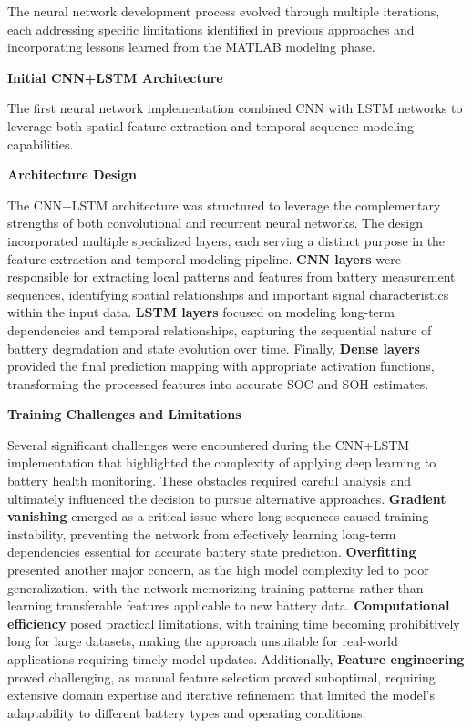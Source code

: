 The neural network development process evolved through multiple iterations, each addressing specific limitations identified in previous approaches and incorporating lessons learned from the MATLAB modeling phase.

\textbf{Initial CNN+LSTM Architecture}

The first neural network implementation combined CNN with LSTM networks to leverage both spatial feature extraction and temporal sequence modeling capabilities.

\textbf{Architecture Design}

The CNN+LSTM architecture was structured to leverage the complementary strengths of both convolutional and recurrent neural networks. The design incorporated multiple specialized layers, each serving a distinct purpose in the feature extraction and temporal modeling pipeline. \textbf{CNN layers} were responsible for extracting local patterns and features from battery measurement sequences, identifying spatial relationships and important signal characteristics within the input data. \textbf{LSTM layers} focused on modeling long-term dependencies and temporal relationships, capturing the sequential nature of battery degradation and state evolution over time. Finally, \textbf{Dense layers} provided the final prediction mapping with appropriate activation functions, transforming the processed features into accurate SOC and SOH estimates.

\textbf{Training Challenges and Limitations}

Several significant challenges were encountered during the CNN+LSTM implementation that highlighted the complexity of applying deep learning to battery health monitoring. These obstacles required careful analysis and ultimately influenced the decision to pursue alternative approaches. \textbf{Gradient vanishing} emerged as a critical issue where long sequences caused training instability, preventing the network from effectively learning long-term dependencies essential for accurate battery state prediction. \textbf{Overfitting} presented another major concern, as the high model complexity led to poor generalization, with the network memorizing training patterns rather than learning transferable features applicable to new battery data. \textbf{Computational efficiency} posed practical limitations, with training time becoming prohibitively long for large datasets, making the approach unsuitable for real-world applications requiring timely model updates. Additionally, \textbf{Feature engineering} proved challenging, as manual feature selection proved suboptimal, requiring extensive domain expertise and iterative refinement that limited the model's adaptability to different battery types and operating conditions.


